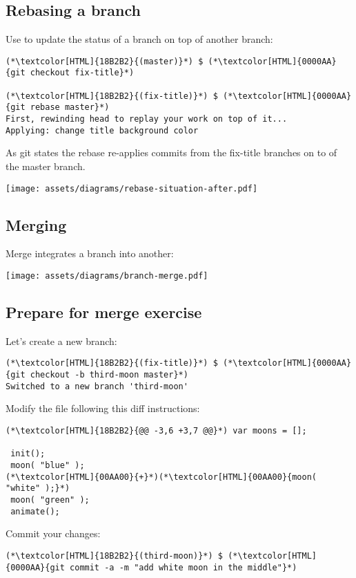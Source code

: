 \subsection{Rebasing a branch}
\begin{frame}[fragile]
  \subslidetitle

  Use  to update the status of a branch on top of another branch:

  \begin{lstlisting}
(*\textcolor[HTML]{18B2B2}{(master)}*) $ (*\textcolor[HTML]{0000AA}{git checkout fix-title}*)

(*\textcolor[HTML]{18B2B2}{(fix-title)}*) $ (*\textcolor[HTML]{0000AA}{git rebase master}*)
First, rewinding head to replay your work on top of it...
Applying: change title background color
\end{lstlisting}

  As git states the rebase re-applies commits from the fix-title branches on to of the master branch.

  \vspace{1em}
  \centerline{\texttt{[image: assets/diagrams/rebase-situation-after.pdf]}}

\end{frame}

\subsection{Merging}
\begin{frame}[fragile]
  \subslidetitle
  Merge integrates a branch into another:
  \centerline{\texttt{[image: assets/diagrams/branch-merge.pdf]}}
\end{frame}

\subsection{Prepare for merge exercise}
\begin{frame}[fragile]
  \subslidetitle

  Let's create a new  branch:
  \begin{lstlisting}
(*\textcolor[HTML]{18B2B2}{(fix-title)}*) $ (*\textcolor[HTML]{0000AA}{git checkout -b third-moon master}*)
Switched to a new branch 'third-moon'
\end{lstlisting}

  Modify the  file following this diff instructions:
  \begin{lstlisting}
(*\textcolor[HTML]{18B2B2}{@@ -3,6 +3,7 @@}*) var moons = [];

 init();
 moon( "blue" );
(*\textcolor[HTML]{00AA00}{+}*)(*\textcolor[HTML]{00AA00}{moon( "white" );}*)
 moon( "green" );
 animate();
\end{lstlisting}
  Commit your changes:
  \begin{lstlisting}
(*\textcolor[HTML]{18B2B2}{(third-moon)}*) $ (*\textcolor[HTML]{0000AA}{git commit -a -m "add white moon in the middle"}*)
\end{lstlisting}
\end{frame}

